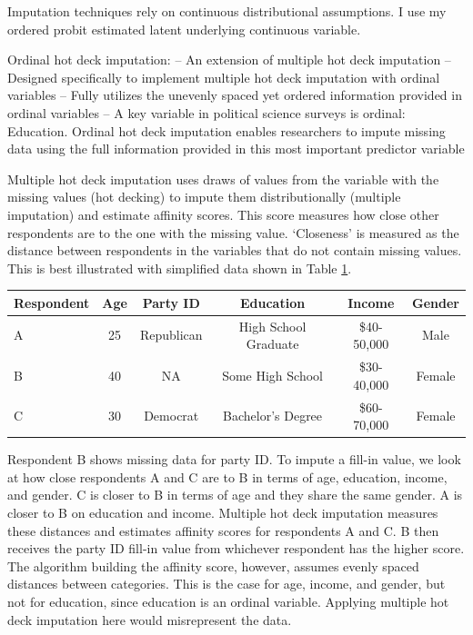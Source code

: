 \documentclass[12pt,econ]{sources/authesis}
\makeatletter
\def\caption{\refstepcounter\@captype \@dblarg{\@caption\@captype}}
\makeatother
\begin{document}
Imputation techniques rely on continuous distributional assumptions.
I use my ordered probit estimated latent underlying continuous variable.

Ordinal hot deck imputation:
-- An extension of multiple hot deck imputation
-- Designed specifically to implement multiple hot deck imputation with ordinal variables
-- Fully utilizes the unevenly spaced yet ordered information provided in ordinal variables
-- A key variable in political science surveys is ordinal: Education. Ordinal hot deck imputation enables researchers to impute missing data using the full information provided in this most important predictor variable

Multiple hot deck imputation uses draws of values from the variable with the missing values (hot decking) to impute them distributionally (multiple imputation) and estimate affinity scores. This score measures how close other respondents are to the one with the missing value. `Closeness' is measured as the distance between respondents in the variables that do not contain missing values. This is best illustrated with simplified data shown in Table \ref{ordmiss-affscore}.
\begin{table}[ht]
  \centering
  \begin{tabular}{lccccc}
  \bottomrule 
  \midrule
  Respondent & Age & Party ID & Education & Income & Gender\\
  \hline
  A & 25 & Republican & High School Graduate & \$40-50,000 & Male \\
  B & 40 & NA & Some High School &  \$30-40,000 & Female\\
  C & 30 & Democrat & Bachelor's Degree &  \$60-70,000 & Female\\
  \bottomrule 
  \end{tabular}
  \caption{Illustrative Data}
  \label{ordmiss-affscore}
\end{table}
Respondent B shows missing data for party ID. To impute a fill-in value, we look at how close respondents A and C are to B in terms of age, education, income, and gender. C is closer to B in terms of age and they share the same gender. A is closer to B on education and income. Multiple hot deck imputation measures these distances and estimates affinity scores for respondents A and C. B then receives the party ID fill-in value from whichever respondent has the higher score. The algorithm building the affinity score, however, assumes evenly spaced distances between categories. This is the case for age, income, and gender, but not for education, since education is an ordinal variable. Applying multiple hot deck imputation here would misrepresent the data.
\end{document}
